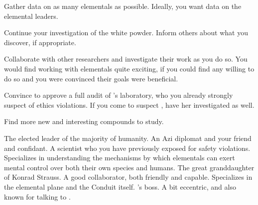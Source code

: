 \documentclass[char]{elementals}
\begin{document}
\begin{itemz}[Goals]
  \item Gather data on as many elementals as possible. Ideally, you want data on the elemental leaders.
  \item Continue your investigation of the white powder. Inform others about what you discover, if appropriate.
  \item Collaborate with other researchers and investigate their work as you do so. You would find working with elementals quite exciting, if you could find any willing to do so and you were convinced their goals were beneficial.
  \item Convince \cLeader{} to approve a full audit of \cMS{}'s laboratory, who you already strongly suspect of ethics violations. If you come to suspect \cGD{}, have her investigated as well.
  \item Find more new and interesting compounds to study.
\end{itemz}

\begin{contacts}
  \contact{\cLeader{}} The elected leader of the majority of humanity.
	\contact{\cDiplomat{}} An Azi diplomat and your friend and confidant.
	\contact{\cMS{}} A scientist who you have previously exposed for safety violations. Specializes in understanding the mechanisms by which elementals can exert mental control over both their own species and humans.
	\contact{\cGD{}} The great granddaughter of Konrad Strauss. A good collaborator, both friendly and capable. Specializes in the elemental plane and the Conduit itself.
  \contact{\cAvatar{}} \cDiplomat{}'s boss. A bit eccentric, and also known for talking to \cAvatar{\themself}.
\end{contacts}
\end{document}
